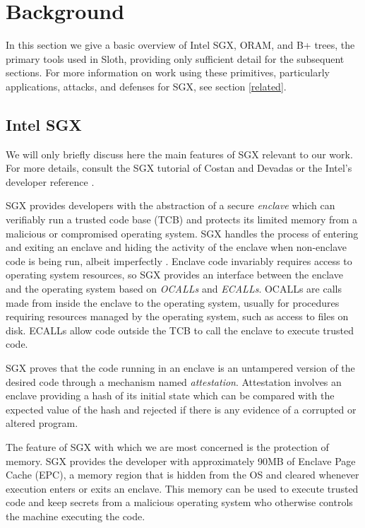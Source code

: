 \documentclass[USenglish,oneside,twocolumn]{article}
\def\name/{Sloth}
\begin{document}
\section{Background}\label{background}
In this section we give a basic overview of Intel SGX, ORAM, and B+ trees, the primary tools used in \name/, providing only sufficient detail for the subsequent sections. For more information on work using these primitives, particularly applications, attacks, and defenses for SGX, see section \ref{related}.

\subsection{Intel SGX}

We will only briefly discuss here the main features of SGX relevant to our work. For more details, consult the SGX tutorial of Costan and Devadas \cite{CD16} or the Intel's developer reference \cite{SGXRef}. 

SGX provides developers with the abstraction of a secure \textit{enclave} which can verifiably run a trusted code base (TCB) and protects its limited memory from a malicious or compromised operating system. SGX handles the process of entering and exiting an enclave and hiding the activity of the enclave when non-enclave code is being run, albeit imperfectly \cite{LSG+16}. Enclave code invariably requires access to operating system resources, so SGX provides an interface between the enclave and the operating system based on \textit{OCALLs} and \textit{ECALLs}. OCALLs are calls made from inside the enclave to the operating system, usually for procedures requiring resources managed by the operating system, such as access to files on disk. ECALLs allow code outside the TCB to call the enclave to execute trusted code. 

SGX proves that the code running in an enclave is an untampered version of the desired code through a mechanism named \textit{attestation}. Attestation involves an enclave providing a hash of its initial state which can be compared with the expected value of the hash and rejected if there is any evidence of a corrupted or altered program. 

The feature of SGX with which we are most concerned is the protection of memory. SGX provides the developer with approximately 90MB of Enclave Page Cache (EPC), a memory region that is hidden from the OS and cleared whenever execution enters or exits an enclave. This memory can be used to execute trusted code and keep secrets from a malicious operating system who otherwise controls the machine executing the code. 
\end{document}
